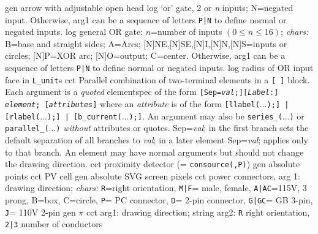   {gen}
  {arrow with adjustable open head}
  {log}
  {`or' gate, 2 or {\sl n\/} inputs; N=negated input.
   Otherwise, arg1 can be a sequence of letters {\tt P|N}
   to define normal or negated inputs.
    }
  {log}
  {general OR gate: $n$=number of inputs $(0\leq n\leq 16)$;
    {\sl chars:} B=base and straight sides; A=Arcs;
           [N]NE,[N]SE,[N]I,[N]N,[N]S=inputs or circles;
           [N]P=XOR arc; [N]O=output; C=center.
   Otherwise, arg1 can be a sequence of letters {\tt P|N}
   to define normal or negated inputs.}
  {log}
  {radius of OR input face in {\tt L\_unit}s}
  {cct}
  { Parallel combination of two-terminal elements in a {\tt [ ]} block.
    Each argument is a {\em quoted} elementspec of the form
    {\tt[Sep={\sl val};][{\sl Label}:] {\sl element}; [{\sl attributes}]}
    where an {\sl attribute} is of the form
    {\tt[llabel($\ldots$);] | [rlabel($\ldots$);] | [b\_current($\ldots$);]}.
    An argument may also be {\tt series\_($\ldots$)} or
    {\tt parallel\_($\ldots$)} {\em without} attributes or quotes. 
    Sep={\sl val}; in the first branch sets the default
    separation of all branches to {\sl val}; in a later
    element Sep={\sl val}; applies only to that branch.
    An element may have normal arguments but should
    not change the drawing direction.
   }
  {cct}
  {proximity detector (= {\tt consource(,P)})}
  {gen}
  {absolute points}
  {cct}
  {PV cell}
  {gen}
  {absolute SVG screen pixels}
  {cct}
  {power connectors, arg 1: drawing direction; {\sl chars:}
   {\tt R}=right orientation,
   {\tt M|F}= male, female,
   {\tt A|AC}=115V, 3 prong, B=box, C=circle,
   {\tt P}= PC connector,
   {\tt D}= 2-pin connector,
   {\tt G|GC}= GB 3-pin,
   {\tt J}= 110V 2-pin
    }
  {gen}
  {$\pi$}
  {cct}
  {arg1: drawing direction; string arg2: {\tt R} right orientation,
   {\tt 2|3} number of conductors
   }
